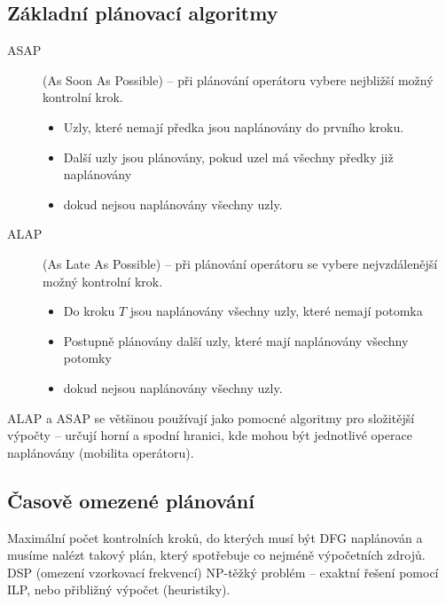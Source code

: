 \documentclass[a4paper, 11pt]{report}
\begin{document}
\subsection{Základní plánovací algoritmy}
\begin{description}
	\item[ASAP] (As Soon As Possible) -- při plánování operátoru vybere nejbližší možný kontrolní krok.
	\begin{itemize}
		\item Uzly, které nemají předka jsou naplánovány do prvního kroku.
		\item Další uzly jsou plánovány, pokud uzel má všechny předky již naplánovány
		\item dokud nejsou naplánovány všechny uzly.
	\end{itemize}
	\item[ALAP] (As Late As Possible) -- při plánování operátoru se vybere nejvzdálenější možný kontrolní krok.
	\begin{itemize}
		\item Do kroku $T$ jsou naplánovány všechny uzly, které nemají potomka
		\item Postupně plánovány další uzly, které mají naplánovány všechny potomky
		\item dokud nejsou naplánovány všechny uzly.
	\end{itemize}
\end{description}
ALAP a ASAP se většinou používají jako pomocné algoritmy pro složitější výpočty -- určují horní a spodní hranici, kde mohou být jednotlivé operace naplánovány (mobilita operátoru).

\subsection{Časově omezené plánování}
Maximální počet kontrolních kroků, do kterých musí být DFG naplánován a musíme nalézt takový plán, který spotřebuje co nejméně výpočetních zdrojů.
DSP (omezení vzorkovací frekvencí)
NP-těžký problém -- exaktní řešení pomocí ILP, nebo přibližný výpočet (heuristiky).
\end{document}
